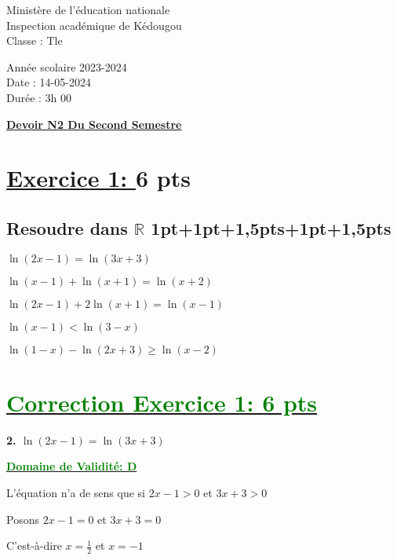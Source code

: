 \documentclass[12pt]{article}
\begin{document}
\begin{minipage}{0.5\textwidth}
	Ministère de l'éducation nationale  \\
	Inspection académique de Kédougou   \\
	Classe : Tle  \\
\end{minipage}
\begin{minipage}{0.5\textwidth}
	Année scolaire 2023-2024 \\
	Date : 14-05-2024 \\
	Durée : 3h 00 \\
\end{minipage}

\begin{center}
	\textbf{{\underline{Devoir N2 Du Second Semestre}}}
\end{center}
\section*{\underline{Exercice 1: }\textbf{6 pts}}
\subsection*{ Resoudre dans $\mathbb{R}$ 1pt+1pt+1,5pts+1pt+1,5pts}
$\ln(2x-1)=\ln(3x+3)$

$\ln(x-1)+\ln(x+1)=\ln(x+2)$

$\ln(2x-1)+2\ln(x+1)=\ln(x-1)$

$\ln(x-1)<\ln(3-x)$

$\ln(1-x)-\ln(2x+3)\geq\ln(x-2)$
\section*{\underline{\textcolor{green}{Correction Exercice 1: \textbf{6 pts}}}}
\textbf{2. \(\ln(2x-1)=\ln(3x+3)\)}

\textbf{\underline{\textcolor{green}{Domaine de Validité: D}}}

L'équation n'a de sens que si $2x-1>0$ et $3x+3>0$

Posons $2x-1=0$ et $3x+3=0$

C'est-à-dire $x=\frac{1}{2}$ et $x=-1$
\end{document}
